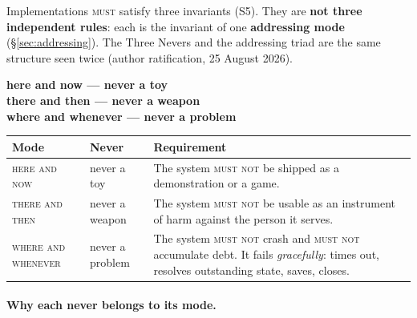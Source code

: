 \documentclass[11pt,a4paper]{article}
\newcommand{\MUST}{\textsc{must}}
\newcommand{\MUSTNOT}{\textsc{must not}}
\begin{document}
Implementations \MUST{} satisfy three invariants (S5). They are \textbf{not
three independent rules}: each is the invariant of one \textbf{addressing mode}
(\S\ref{sec:addressing}). The Three Nevers and the addressing triad are the same
structure seen twice (author ratification, 25 August 2026).

\begin{ruleblock}
\begin{center}
\textbf{here and now --- never a toy}\\
\textbf{there and then --- never a weapon}\\
\textbf{where and whenever --- never a problem}
\end{center}
\end{ruleblock}

\begin{center}
\begin{tabular}{@{}>{\raggedright\arraybackslash}p{3.1cm}>{\raggedright\arraybackslash}p{2.6cm}>{\raggedright\arraybackslash}p{8.4cm}@{}}
\toprule
\textbf{Mode} & \textbf{Never} & \textbf{Requirement} \\
\midrule
\textsc{here and now} & never a toy & The system \MUSTNOT{} be shipped as a
  demonstration or a game. \\[2pt]
\textsc{there and then} & never a weapon & The system \MUSTNOT{} be usable as an
  instrument of harm against the person it serves. \\[2pt]
\textsc{where and whenever} & never a problem & The system \MUSTNOT{} crash and
  \MUSTNOT{} accumulate debt. It fails \emph{gracefully}: times out, resolves
  outstanding state, saves, closes. \\
\bottomrule
\end{tabular}
\end{center}

\paragraph{Why each never belongs to its mode.}
\end{document}
